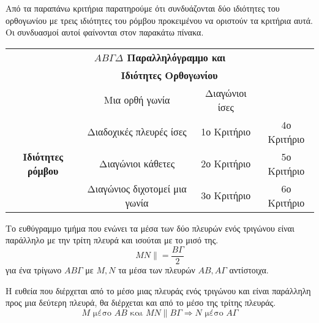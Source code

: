 \documentclass[twoside,nofonts,internet,shmeiwseis]{thewria}
\begin{document}
Από τα παραπάνω κριτήρια παρατηρούμε ότι συνδυάζονται δύο ιδιότητες του ορθογωνίου με τρεις ιδιότητες του ρόμβου προκειμένου να οριστούν τα κριτήρια αυτά. Οι συνδυασμοί αυτοί φαίνονται στον παρακάτω πίνακα.
\begin{center}
\begin{tabular}{c|c|c|c}
\hline \multicolumn{4}{c}{\textbf{{\boldmath$ AB\varGamma\varDelta $} Παραλληλόγραμμο και}}  \rule[-2ex]{0pt}{5.5ex}\\ 
\hhline{====} \multicolumn{2}{c|}{} & \multicolumn{2}{c}{\textbf{Ιδιότητες Ορθογωνίου}}  \rule[-2ex]{0pt}{5.5ex}\\ 
\hhline{~~|--}  \multicolumn{2}{c|}{}  & Μια ορθή γωνία & Διαγώνιοι ίσες \rule[-2ex]{0pt}{5.5ex}\\ 
\hline \multirow{5}{*}{\textbf{Ιδιότητες ρόμβου}} & Διαδοχικές πλευρές ίσες & 1ο Κριτήριο & 4ο Κριτήριο \rule[-2ex]{0pt}{5.5ex}\\ 
\hhline{~-|--} \rule[-2ex]{0pt}{5.5ex} & Διαγώνιοι κάθετες & 2ο Κριτήριο & 5ο Κριτήριο \\ 
\hhline{~---} \rule[-2ex]{0pt}{5.5ex} & Διαγώνιος διχοτομεί μια γωνία & 3ο Κριτήριο & 6ο Κριτήριο \\ 
\hline 
\end{tabular} 
\end{center}
Το ευθύγραμμο τμήμα που ενώνει τα μέσα των δύο πλευρών ενός τριγώνου είναι παράλληλο με την τρίτη πλευρά και ισούται με το μισό της.
\[ MN\parallel=\frac{B\varGamma}{2} \]
για ένα τρίγωνο $ AB\varGamma $ με $ M,N $ τα μέσα των πλευρών $ AB,A\varGamma $ αντίστοιχα.
\begin{center}
\end{center}
Η ευθεία που διέρχεται από το μέσο μιας πλευράς ενός τριγώνου και είναι παράλληλη προς μια δεύτερη πλευρά, θα διέρχεται και από το μέσο της τρίτης πλευράς.
\[ M\textrm{ μέσο }AB\textrm{ και }MN\parallel B\varGamma\Rightarrow N\textrm{ μέσο }A\varGamma \]
\end{document}
